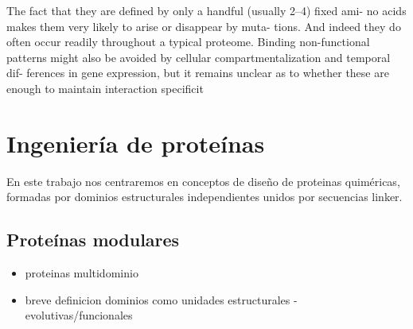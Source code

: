 The fact
that they are defined by only a handful (usually 2–4) fixed ami-
no acids makes them very likely to arise or disappear by muta-
tions. And indeed they do often occur readily throughout a
typical proteome.
Binding non-functional patterns might also
be avoided by cellular compartmentalization and temporal dif-
ferences in gene expression, but it remains unclear as to whether
these are enough to maintain interaction specificit























\section{Ingeniería de proteínas}
\label{proteinEngineering}


En este trabajo nos centraremos en conceptos de diseño de proteinas quiméricas, formadas por dominios estructurales independientes unidos por secuencias linker.





\subsection{Proteínas modulares}
\begin{itemize}
 \item proteinas multidominio
 \item breve definicion dominios como unidades estructurales - evolutivas/funcionales
\end{itemize}


